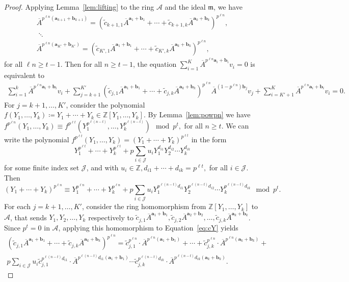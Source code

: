 \documentclass[10pt,a4paper]{amsart}
\newcommand{\Z}{\mathbb{Z}}
\newcommand{\ba}{\boldsymbol{a}}
\newcommand{\bb}{\boldsymbol{b}}
\newcommand{\frm}{\mathfrak{m}}
\newcommand{\mA}{\mathcal{A}}
\newcommand{\mJ}{\mathcal{J}}
\newcommand{\oA}{\overline{A}}
\newcommand{\tc}{\widetilde{c}}
\begin{document}
\begin{proof}
    Applying Lemma~\ref{lem:lifting} to the ring $\mA$ and the ideal $\frm$, we have
    \begin{multline*}
    \oA^{p^{\ell n}(\ba_{k+1} + \bb_{k+1})} = \left(\tc_{k+1,1} \oA^{\ba_1 + \bb_1} + \cdots + \tc_{k+1,k} \oA^{\ba_k + \bb_k} \right)^{p^{\ell n}}, \\\;\ddots\; \\
    \oA^{p^{\ell n}(\ba_{K'} + \bb_{K'})} = \left(\tc_{K',1} \oA^{\ba_1 + \bb_1} + \cdots + \tc_{K',k} \oA^{\ba_k + \bb_k} \right)^{p^{\ell n}},
    \end{multline*}
    for all $\ell n \geq t-1$.
    Then for all $n \geq t-1$, the equation $\sum_{i = 1}^K \oA^{p^{\ell n} \ba_i + \bb_i} v_i = 0$ is equivalent to
    \begin{multline}\label{eq:sumyv}
    \sum_{i = 1}^k \oA^{p^{\ell n} \ba_i + \bb_i} v_i + \sum_{j = k+1}^{K'} \left(\tc_{j,1} \oA^{\ba_1 + \bb_1} + \cdots + \tc_{j,k} \oA^{\ba_k + \bb_k} \right)^{p^{\ell n}} \oA^{(1 - p^{\ell n}) \bb_j} v_j + \sum_{i = K'+1}^K \oA^{p^{\ell n} \ba_i + \bb_i} v_i = 0.
    \end{multline}
    For $j = k+1, \ldots, K'$, consider the polynomial $f(Y_1, \ldots, Y_k) \coloneqq Y_1 + \cdots + Y_k \in \Z[Y_1, \ldots, Y_k]$.
    By Lemma~\ref{lem:powpn} we have
    $
    f^{p^{\ell n}}(Y_1, \ldots, Y_k) \equiv f^{p^{\ell t}}(Y_1^{p^{\ell (n-t)}}, \ldots, Y_k^{p^{\ell (n-t)}}) \mod p^t,
    $
    for all $n \geq t$.
    We can write the polynomial $f^{p^{\ell t}}(Y_1, \ldots, Y_k) = (Y_1 + \cdots + Y_k)^{p^{\ell t}}$ in the form
    \[
    Y_1^{p^{\ell t}} + \cdots + Y_k^{p^{\ell t}} + p \sum_{i \in \mJ} u_{i} Y_1^{d_{i1}} Y_2^{d_{i2}} \cdots Y_k^{d_{ik}}
    \]
    for some finite index set $\mJ$, and with $u_i \in \Z, d_{i1} + \cdots + d_{ik} = p^{\ell t},$ for all $i \in \mJ$.
    Then
    \begin{equation}\label{eq:cY}
    (Y_1 + \cdots + Y_k)^{p^{\ell n}} \equiv Y_1^{p^{\ell n}} + \cdots + Y_k^{p^{\ell n}} + p \sum_{i \in \mJ} u_{i} Y_1^{p^{\ell (n - t)} d_{i1}} Y_2^{p^{\ell (n - t)} d_{i2}} \cdots Y_k^{p^{\ell (n - t)} d_{ik}} \mod p^t.
    \end{equation}
    For each $j = k+1, \ldots, K'$, consider the ring homomorphism from $\Z[Y_1, \ldots, Y_k]$ to $\mA$, that sends $Y_1, Y_2, \ldots, Y_k$ respectively to $\tc_{j,1} \oA^{\ba_1 + \bb_1}, \tc_{j,2} \oA^{\ba_2 + \bb_2}, \ldots, \tc_{j,k} \oA^{\ba_k + \bb_k}$.
    Since $p^t = 0$ in $\mA$, applying this homomorphism to Equation~\eqref{eq:cY} yields
    \begin{multline}\label{eq:unfoldpln}
    \left(\tc_{j,1} \oA^{\ba_1 + \bb_1} + \cdots + \tc_{j,k} \oA^{\ba_k + \bb_k}\right)^{p^{\ell n}} = \tc_{j,1}^{p^{\ell n}} \cdot \oA^{p^{\ell n}(\ba_1 + \bb_1)} + \cdots + \tc_{j,k}^{p^{\ell n}} \cdot \oA^{p^{\ell n}(\ba_k + \bb_k)} + \\
    p \sum_{i \in \mJ} u_{i} \tc_{j,1}^{p^{\ell (n - t)} d_{i1}} \cdot \oA^{p^{\ell (n-t)}d_{i1}(\ba_1 + \bb_1)} \cdots \tc_{j,k}^{p^{\ell (n - t)} d_{ik}} \cdot \oA^{p^{\ell (n-t)}d_{ik}(\ba_k + \bb_k)}.
    \end{multline}
    

\end{proof}
\end{document}
